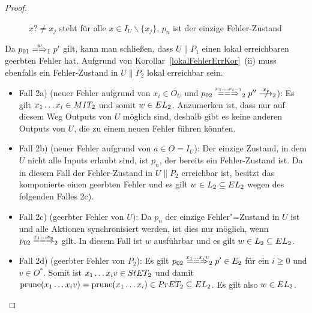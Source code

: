 \begin{proof}
\begin{itemize}
\begin{figure} [h!tbp]
\begin{center}
        \caption{$x?\neq x_j$ steht für alle $x\in I_U\backslash\{x_j\}$, $p_n$
          ist der einzige Fehler-Zustand}
      \label{UmitE}
      \end{center}
      \end{figure}
      Da $p_{01}\weakmay[w]_1p'$ gilt, kann man schließen, dass $U\|P_1$ einen
      lokal erreichbaren geerbten Fehler hat. Aufgrund von
      Korollar~\ref{lokalFehlerErrKor}~(ii) muss ebenfalls ein Fehler-Zustand
      in $U\|P_2$ lokal erreichbar sein.
      \begin{itemize}
        \item Fall 2a) (neuer Fehler aufgrund von $x_i\in O_U$ und $p_{02}
          \lweakmay[x_1\dots x_{i-1}]_2p''\nmust[x_i]_2$): Es gilt $x_1\dots
          x_i\in MIT _2$ und somit $w\in EL_2$. Anzumerken ist, dass nur
          auf diesem Weg Outputs von $U$ möglich sind, deshalb gibt es keine
          anderen Outputs von $U$, die zu einem neuen Fehler führen könnten.
        \item Fall 2b) (neuer Fehler aufgrund von $a\in O=I_U$): Der einzige
          Zustand, in dem $U$ nicht alle Inputs erlaubt sind, ist $p_n$, der
          bereits ein Fehler-Zustand ist. Da in diesem Fall der Fehler-Zustand
          in $U\|P_2$ erreichbar ist, besitzt das komponierte \MEIO{} einen
          geerbten Fehler und es gilt $w\in L_2\subseteq EL _2$ wegen des
          folgenden Falles 2c).
        \item Fall 2c) (geerbter Fehler von $U$): Da $p_n$ der einzige
          Fehler"=Zustand in $U$ ist und alle Aktionen synchronisiert werden,
          ist dies nur möglich, wenn $p_{02} \lweakmay[x_1\dots x_n]_2$ gilt.
          In diesem Fall ist $w$ ausführbar und es gilt $w\in L_2\subseteq EL
          _2$.
        \item Fall 2d) (geerbter Fehler von $P_2$): Es gilt $p_{02}
          \lweakmay[x_1\dots x_iv]_2 p'\in E_2$ für ein $i\geq 0$ und $v\in
          O^*$. Somit ist $x_1\dots x_iv\in StET _2$ und damit $\mathrm{prune}
          (x_1\dots x_iv) =\mathrm{prune} (x_1\dots x_i)\in PrET _2\subseteq EL _2$.
          Es gilt also $w\in EL _2$.
      \end{itemize}
  \end{itemize}
\end{proof}

